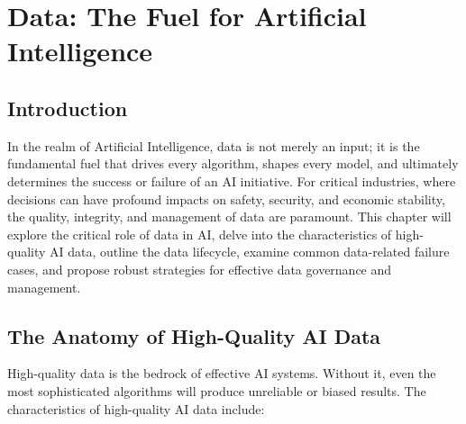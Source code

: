 \chapter{Data: The Fuel for Artificial Intelligence}
\label{chap:data_the_fuel_for_artificial_intelligence}

\section{Introduction}
\label{sec:data_introduction}
In the realm of Artificial Intelligence, data is not merely an input; it is the fundamental fuel that drives every algorithm, shapes every model, and ultimately determines the success or failure of an AI initiative. For critical industries, where decisions can have profound impacts on safety, security, and economic stability, the quality, integrity, and management of data are paramount. This chapter will explore the critical role of data in AI, delve into the characteristics of high-quality AI data, outline the data lifecycle, examine common data-related failure cases, and propose robust strategies for effective data governance and management.

\section{The Anatomy of High-Quality AI Data}
\label{sec:anatomy_of_data}
High-quality data is the bedrock of effective AI systems. Without it, even the most sophisticated algorithms will produce unreliable or biased results. The characteristics of high-quality AI data include:

